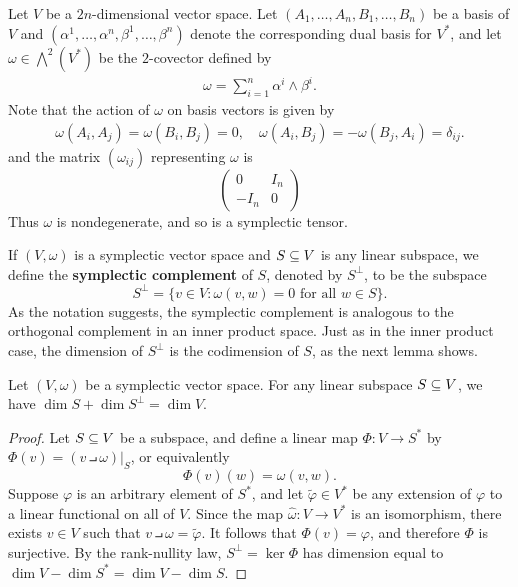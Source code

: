 \begin{example}\label{symplectic tensor eg}
Let $V$ be a $2n$-dimensional vector space. Let $(A_1,\dots,A_n,B_1,\dots,B_n)$ be a basis of $V$ and $(\alpha^1,\dots,\alpha^n,\beta^1,\dots,\beta^n)$ denote the corresponding dual basis for $V^*$, and let $\omega\in\bigwedge^2(V^*)$ be the $2$-covector defined by
\begin{align}\label{symplectic tensor-1}
\omega=\sum_{i=1}^{n}\alpha^i\wedge\beta^i.
\end{align}
Note that the action of $\omega$ on basis vectors is given by
\begin{align}\label{symplectic tensor-2}
\omega(A_i,A_j)=\omega(B_i,B_j)=0,\quad \omega(A_i,B_j)=-\omega(B_j,A_i)=\delta_{ij}.
\end{align}
and the matrix $(\omega_{ij})$ representing $\omega$ is
\[\begin{pmatrix}
0&I_n\\
-I_n&0
\end{pmatrix}\]
Thus $\omega$ is nondegenerate, and so is a symplectic tensor.
\end{example}

If $(V,\omega)$ is a symplectic vector space and $S\subseteq V$ is any linear subspace, we define the \textbf{symplectic complement} of $S$, denoted by $S^\bot$, to be the subspace
\[S^\bot=\{v\in V:\omega(v,w)=0\text{ for all $w\in S$}\}.\]
As the notation suggests, the symplectic complement is analogous to the orthogonal complement in an inner product space. Just as in the inner product case, the dimension of $S^\bot$ is the codimension of $S$, as the next lemma shows.

\begin{lemma}\label{symplectic complement dim}
Let $(V,\omega)$ be a symplectic vector space. For any linear subspace
$S\subseteq V$, we have $\dim S+\dim S^\bot=\dim V$.
\end{lemma}
\begin{proof}
Let $S\subseteq V$ be a subspace, and define a linear map $\varPhi:V\to S^*$ by $\varPhi(v)=(v\intprod\omega)|_S$, or equivalently
\[\varPhi(v)(w)=\omega(v,w).\]
Suppose $\varphi$ is an arbitrary element of $S^*$, and let $\widetilde{\varphi}\in V^*$ be any extension of $\varphi$ to a linear functional on all of $V$. Since the map $\widehat{\omega}:V\to V^*$ is an isomorphism, there exists $v\in V$ such that $v\intprod\omega=\widetilde{\varphi}$. It follows that $\varPhi(v)=\varphi$, and therefore $\varPhi$ is surjective. By the rank-nullity law, $S^\bot=\ker\varPhi$ has dimension equal to $\dim V-\dim S^*=\dim V-\dim S$.
\end{proof}

